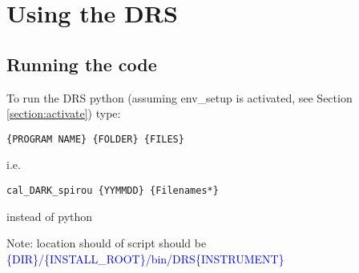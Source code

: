 \chapter{Using the DRS}


\section{Running the code}
\label{section:run_code}

To run the DRS python (assuming env\_setup is activated, see Section \ref{section:activate}) type:
\begin{lstlisting}[style=bashstyle]
{PROGRAM NAME} {FOLDER} {FILES}
\end{lstlisting}
 
\noindent i.e. 
\begin{lstlisting}[style=bashstyle]
cal_DARK_spirou {YYMMDD} {Filenames*}
\end{lstlisting}  

\noindent instead of python

\noindent Note: location should of script should be \textcolor{blue}{\{DIR\}/\{INSTALL\_ROOT\}/bin/DRS\{INSTRUMENT\}}

